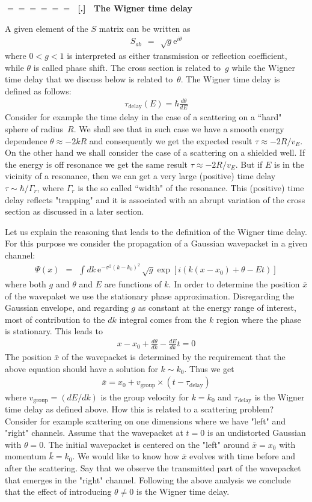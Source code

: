 \documentclass[onecolumn,fleqn]{revtex4}
\newcommand{\eexp}{\mathrm{e}^}
\newcommand{\tbox}[1]{\text{#1}}
\newcommand{\beq}{\begin{eqnarray}}
\newcommand{\eeq}{\end{eqnarray}}
\renewcommand{\thesubsection}{\arabic{subsection}}
\renewcommand{\thesubsubsection}{\arabic{subsubsection}}
\newcommand{\sheadC}[1]
{
\addtocounter{subsubsection}{1}
\vspace{5mm}
{\Large\bf $=\!=\!=\!=\!=\!=\;$ [\thesubsection.\thesubsubsection] \ #1}  
\nopagebreak
\phantomsection
}
\begin{document}
\sheadC{The Wigner time delay} 


A given element of the $S$ matrix can be written as 
\beq 
S_{ab} \ \ = \ \ \sqrt{g}\eexp{i\theta}
\eeq
where $0<g<1$ is interpreted as either 
transmission or reflection coefficient, 
while $\theta$ is called phase shift.
The cross section is related to~$g$    
while the Wigner time delay that we discuss     
below is related to~$\theta$. 
The Wigner time delay is defined as follows: 
\beq 
\tau_{\tbox{delay}}(E) = \hbar\frac{d\theta}{dE} 
\eeq
Consider for example the time delay in the case 
of a scattering on a ``hard" sphere of radius~$R$. 
We shall see that in such case we have a smooth energy 
dependence $\theta \approx -2kR$ and consequently  
we get the expected result $\tau \approx -2R/v_E$.  
On the other hand we shall consider the case 
of a scattering on a shielded well. 
If the energy is off resonance we get 
the same result $\tau \approx -2R/v_E$. 
But if $E$ is in the vicinity of a resonance, 
then we can get a very large (positive) 
time delay $\tau \sim \hbar/\Gamma_r$, 
where $\Gamma_r$ is the so called ``width" 
of the resonance.  This (positive) time delay 
reflects "trapping" and it is associated 
with an abrupt variation of the cross section 
as discussed in a later section.



Let us explain the reasoning that leads 
to the definition of the Wigner time delay.
For this purpose we consider the propagation of 
a Gaussian wavepacket in a given channel: 
\beq
\Psi(x) \ \ = \ \ \int dk \ \eexp{-\sigma^2(k-k_0)^2} 
\, \sqrt{g}\exp\left[ i\left( k(x-x_0) + \theta - Et \right)\right]
\eeq 
where both $g$ and $\theta$ and $E$ are functions of $k$. 
In order to determine the position $\bar{x}$ of the wavepaket 
we use the stationary phase approximation.  
Disregarding the Gaussian envelope, and regarding $g$ 
as constant at the energy range of interest, 
most of contribution to the $dk$ integral comes from 
the $k$ region where the phase is stationary. This leads to 
\beq 
x-x_0 + \frac{d\theta}{dk} - \frac{dE}{dk}t = 0
\eeq 
The position $\bar{x}$ of the wavepacket is 
determined by the requirement that the above 
equation should have a solution for $k \sim k_0$. 
Thus we get
\beq 
\bar{x} = x_0  + v_{\tbox{group}} \times (t-\tau_{\tbox{delay}})
\eeq 
where $v_{\tbox{group}}=(dE/dk)$ is the group velocity 
for $k=k_0$ and $\tau_{\tbox{delay}}$ is the Wigner time 
delay as defined above. 
How this is related to a scattering problem?
Consider for example scattering on one dimensions 
where we have "left" and "right" channels.
Assume that the wavepacket at $t=0$ 
is an undistorted Gaussian with $\theta=0$. 
The initial wavepacket is centered on the "left" 
around $\bar{x}=x_0$ with momentum $\bar{k}=k_0$. 
We would like to know how  $\bar{x}$ evolves  
with time before and after the scattering. 
Say that we observe the transmitted part of 
the wavepacket that emerges in the "right" channel.
Following the above analysis we conclude that 
the effect of introducing $\theta \ne 0$ 
is the Wigner time delay.  
\end{document}
